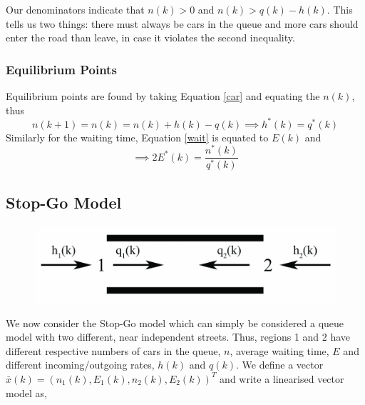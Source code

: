 \documentclass[a4paper]{article}
\begin{document}
Our denominators indicate that $n(k)>0$ and $n(k) > q(k) - h(k)$. This tells us two things: there must always be cars in the queue and more cars should enter the road than leave, in case it violates the second inequality.
\subsubsection{Equilibrium Points}
Equilibrium points are found by taking Equation \ref{car} and equating the $n(k)$, thus
\[n(k+1) = n(k) = n(k) +h (k) -q(k) \implies h^*(k) = q^*(k)\]
Similarly for the waiting time, Equation \ref{wait} is equated to $E(k)$ and
\[\implies 2E^*(k) = \frac{n^*(k)}{q^*(k)}\]

\subsection{Stop-Go Model}

\begin{figure}[h]
\centering
\includegraphics[scale=0.5]{stop.jpg}
\end{figure}
We now consider the Stop-Go model which can simply be considered a queue model with two different, near independent streets. Thus, regions 1 and 2 have different respective numbers of cars in the queue, $n$, average waiting time, $E$ and different incoming/outgoing rates, $h(k)$ and $q(k)$. We define a vector $\bar{x}(k) = (n_1(k), E_1(k), n_2(k), E_2(k))^T$ and write a linearised vector model as,
\end{document}
